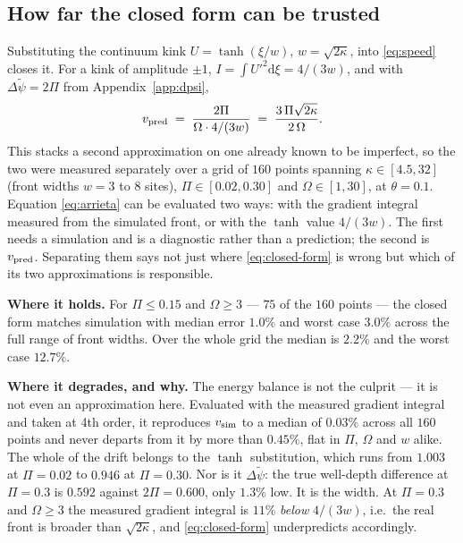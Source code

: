 \subsection*{How far the closed form can be trusted}

Substituting the continuum kink $U = \tanh(\xi/w)$, $w = \sqrt{2\kappa}$, into
\eqref{eq:speed} closes it. For a kink of amplitude $\pm 1$,
$I = \int U'^2 \mathrm{d}\xi = 4/(3w)$, and with $\Delta\tilde\psi = 2\Pi$ from
Appendix~\ref{app:dpsi},
%
\begin{equation}
  v_{\rm pred} \;=\; \frac{2\Pi}{\Omega \cdot 4/(3w)} \;=\; \frac{3\,\Pi\sqrt{2\kappa}}{2\,\Omega}.
  \label{eq:closed-form}
\end{equation}
%
This stacks a second approximation on one already known to be imperfect, so the two
were measured separately over a grid of $160$ points spanning
$\kappa \in [4.5, 32]$ (front widths $w = 3$ to $8$ sites), $\Pi \in [0.02, 0.30]$ and
$\Omega \in [1, 30]$, at $\theta = 0.1$. Equation \eqref{eq:arrieta} can be evaluated
two ways: with the gradient integral measured from the simulated front, or with the
$\tanh$ value $4/(3w)$. The first needs a simulation and is a diagnostic rather than a
prediction; the second is $v_{\rm pred}$. Separating them says not just where
\eqref{eq:closed-form} is wrong but which of its two approximations is responsible.

\textbf{Where it holds.} For $\Pi \le 0.15$ and $\Omega \ge 3$ --- $75$ of the $160$
points --- the closed form matches simulation with median error $1.0\%$ and worst case
$3.0\%$ across the full range of front widths. Over the whole grid the median is
$2.2\%$ and the worst case $12.7\%$.

\textbf{Where it degrades, and why.} The energy balance is not the culprit --- it is not
even an approximation here. Evaluated with the measured gradient integral and taken at
4th order, it reproduces $v_{\rm sim}$ to a median of $0.03\%$ across all $160$ points and
never departs from it by more than $0.45\%$, flat in $\Pi$, $\Omega$ and $w$ alike. The
whole of the drift belongs to the $\tanh$ substitution, which runs from $1.003$ at
$\Pi = 0.02$ to $0.946$ at $\Pi = 0.30$. Nor is it $\Delta\tilde\psi$:
the true well-depth difference at $\Pi = 0.3$ is $0.592$ against $2\Pi = 0.600$, only
$1.3\%$ low. It is the width. At $\Pi = 0.3$ and $\Omega \ge 3$ the measured gradient
integral is $11\%$ \emph{below} $4/(3w)$, i.e.\ the real front is broader than
$\sqrt{2\kappa}$, and \eqref{eq:closed-form} underpredicts accordingly.

